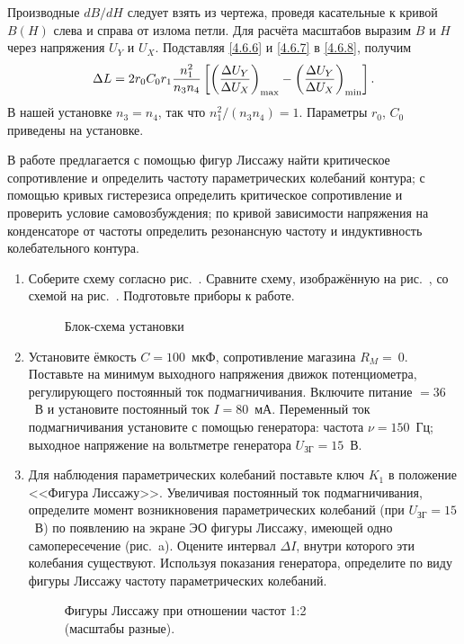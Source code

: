 Производные $dB/dH$ следует взять из чертежа, проведя касательные к кривой
$B(H)$ слева и справа от излома петли. Для расчёта масштабов выразим $B$ и $H$
через напряжения $U_Y$ и $U_X$. Подставляя \eqref{4.6.6} и \eqref{4.6.7} в
\eqref{4.6.8}, получим
\begin{equation}
	\eqmark{4.6.9}
	\Delta L = 2r_0C_0r_1\frac{n^2_1}{n_3n_4}\left[\left(\frac{\Delta
U_Y}{\Delta U_X}\right)_{\rm max} - \left(\frac{\Delta U_Y}{\Delta
U_X}\right)_{\rm min}\right].
\end{equation}
В нашей установке $n_3 = n_4$, так что $n_1^2/ (n_3n_4) = 1$. Параметры $r_0$,
$C_0$ приведены на установке.

\begin{lab:task}
В работе предлагается с помощью фигур Лиссажу найти критическое сопротивление и
определить частоту параметрических колебаний контура; с помощью кривых
гистерезиса определить критическое сопротивление и проверить условие
самовозбуждения; по кривой зависимости напряжения на конденсаторе от частоты
определить резонансную частоту и индуктивность колебательного контура.
\begin{enumerate}
\item
Соберите схему согласно рис.~. Сравните схему, изображённую
на рис.~, со схемой на рис.~. Подготовьте приборы к работе.
\begin{figure}[h!]
\centering
	\caption{Блок-схема установки}
\end{figure}

\item
Установите ёмкость $C = 100$~мкФ, сопротивление магазина $R_M =~0.$ Поставьте на
минимум выходного напряжения движок потенциометра, регулирующего постоянный ток
подмагничивания. Включите питание $= 36$~В и установите постоянный ток $I
=80$~мА. Переменный ток подмагничивания установите с помощью генератора: частота
$\nu = 150$~Гц; выходное напряжение на вольтметре генератора $U_\text{ЗГ} =
15$~В.

\item
Для наблюдения параметрических колебаний поставьте ключ $K_1$ в положение
<<Фигура Лиссажу>>. Увеличивая постоянный ток подмагничивания, определите момент
возникновения параметрических колебаний (при $U_\text{ЗГ} = 15$~В) по появлению
на экране ЭО фигуры Лиссажу, имеющей одно самопересечение (рис.~a). Оцените интервал $\Delta I$, внутри которого эти колебания
существуют. Используя показания генератора, определите по виду фигуры Лиссажу
частоту параметрических колебаний.
\begin{figure}[h!]
\centering
	\caption{Фигуры Лиссажу при отношении частот 1:2 \\(масштабы разные).}
\end{figure}


\end{enumerate}
\end{lab:task}
